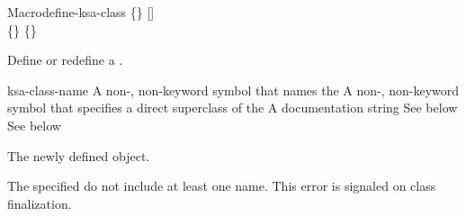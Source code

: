 \documentclass[10pt,twoside,english,pdftex]{article}
\begin{document}

\begin{functiondoc}{Macro}{define-ksa-class}%
   { 
   \code{(}\{\}\superstar\code{)}
   [] \\
   \code{(}\{\}\superstar\code{)}
   \{\}\superstar{} \returns{}
   }
%
%
%

\fnsyntax

\fnpurpose Define or redefine a .

\fnpackage {}

\fnmodule {}

\fnargs
\begin{args}{ksa-class-name}
 A non-\nil, non-keyword symbol that names the
 A non-\nil, non-keyword symbol that specifies a
direct superclass of the    
\arg[documentation] A documentation string
 See below
 See below
\end{args}

\fnreturns The newly defined  object.

\fnerrors The specified  do not include at least
one  name.  This error is signaled on class finalization.


\end{functiondoc}
\end{document}
